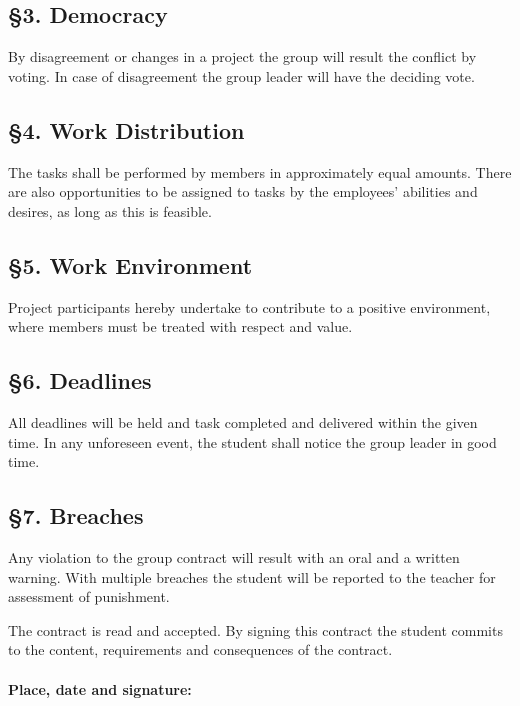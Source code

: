 \documentclass{article}
\begin{document}
\subsection*{§3. Democracy}
By disagreement or changes in a project the group will result the conflict by voting. In case of disagreement the group leader will have the deciding vote.

\subsection*{§4. Work Distribution}
The tasks shall be performed by members in approximately equal amounts. There are also opportunities to be assigned to tasks by the employees' abilities and desires, as long as this is feasible.

\subsection*{§5. Work Environment}
Project participants hereby undertake to contribute to a positive environment, where members must be treated with respect and value.

\subsection*{§6. Deadlines}
All deadlines will be held and task completed and delivered within the given time. In any unforeseen event, the student shall notice the group leader in good time.

\subsection*{§7. Breaches}
Any violation to the group contract will result with an oral and a written warning. With multiple breaches the student will be reported to the teacher for assessment of punishment.
\newpage

\vspace*{1 cm}
The contract is read and accepted. By signing this contract the student commits to the content, requirements and consequences of the contract.\\\\
\textbf{Place, date and signature:}\\
\end{document}
